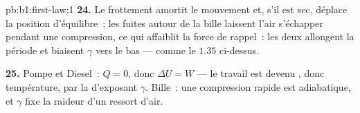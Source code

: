 \begin{solution}{pb:b1:first-law:1}
\textbf{24.} Le frottement amortit le mouvement et, s'il est sec, déplace la
position d'équilibre~; les fuites autour de la bille laissent l'air s'échapper
pendant une compression, ce qui affaiblit la force de rappel~: les deux
allongent la période et biaisent $\gamma$ vers le bas --- comme le $1.35$ ci-dessus.

\textbf{25.} Pompe et Diesel~: $Q = 0$, donc $\Delta U = W$ --- le travail est
devenu , donc température, par la  d'exposant
$\gamma$. Bille~: une compression rapide est adiabatique, et $\gamma$ fixe la
raideur d'un ressort d'air.
\end{solution}
